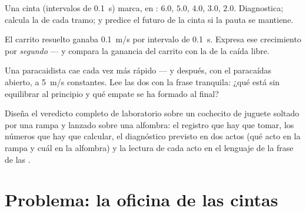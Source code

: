 \begin{exercise}[$\star\star$]\label{exo:g9:uniform-varied-motion:9}
Una cinta (intervalos de \qty{0.1}{s}) marca, en
: $6.0$, $5.0$, $4.0$, $3.0$, $2.0$. Diagnostica;
calcula la  de cada tramo; y predice el futuro de la
cinta si la pauta se mantiene.
\end{exercise}

\begin{exercise}[$\star\star$]\label{exo:g9:uniform-varied-motion:10}
El carrito resuelto ganaba \qty{0.1}{m/s} por intervalo de
\qty{0.1}{s}. Expresa ese crecimiento por \emph{segundo} --- y compara
la ganancia del carrito con la de la caída libre.
\end{exercise}

\begin{exercise}[$\star\star$]\label{exo:g9:uniform-varied-motion:11}
Una paracaidista cae cada vez más rápido --- y después, con el
paracaídas abierto, a \qty{5}{m/s} constantes. Lee las dos
 con la frase tranquila: ¿qué está sin equilibrar al
principio y qué empate se ha formado al final?
\end{exercise}

\begin{exercise}[$\star\star\star$]\label{exo:g9:uniform-varied-motion:12}
Diseña el veredicto completo de laboratorio sobre un cochecito de
juguete soltado por una rampa y lanzado sobre una alfombra: el registro
que hay que tomar, los números que hay que calcular, el diagnóstico
previsto en dos actos (qué acto en la rampa y cuál en la alfombra) y la
lectura de cada acto en el lenguaje de la frase de las .
\end{exercise}

\section{Problema: la oficina de las cintas}


